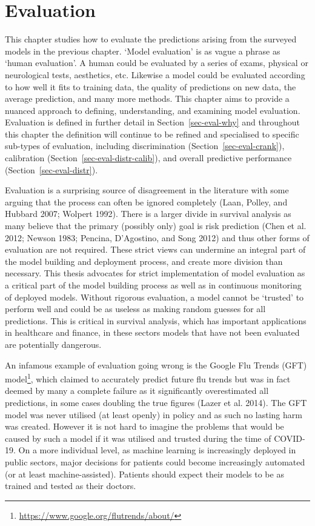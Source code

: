 \documentclass[
  letterpaper,
]{scrbook}
\theoremstyle{plain}
\theoremstyle{definition}
\theoremstyle{remark}
\begin{document}

\hypertarget{evaluation}{%
\chapter{Evaluation}\label{evaluation}}

This chapter studies how to evaluate the predictions arising from the
surveyed models in the previous chapter. `Model evaluation' is as vague
a phrase as `human evaluation'. A human could be evaluated by a series
of exams, physical or neurological tests, aesthetics, etc. Likewise a
model could be evaluated according to how well it fits to training data,
the quality of predictions on new data, the average prediction, and many
more methods. This chapter aims to provide a nuanced approach to
defining, understanding, and examining model evaluation. Evaluation is
defined in further detail in Section~\ref{sec-eval-why} and throughout
this chapter the definition will continue to be refined and specialised
to specific sub-types of evaluation, including discrimination
(Section~\ref{sec-eval-crank}), calibration
(Section~\ref{sec-eval-distr-calib}), and overall predictive performance
(Section~\ref{sec-eval-distr}).

Evaluation is a surprising source of disagreement in the literature with
some arguing that the process can often be ignored completely (Laan,
Polley, and Hubbard 2007; Wolpert 1992). There is a larger divide in
survival analysis as many believe that the primary (possibly only) goal
is risk prediction (Chen et al. 2012; Newson 1983; Pencina, D'Agostino,
and Song 2012) and thus other forms of evaluation are not required.
These strict views can undermine an integral part of the model building
and deployment process, and create more division than necessary. This
thesis advocates for strict implementation of model evaluation as a
critical part of the model building process as well as in continuous
monitoring of deployed models. Without rigorous evaluation, a model
cannot be `trusted' to perform well and could be as useless as making
random guesses for all predictions. This is critical in survival
analysis, which has important applications in healthcare and finance, in
these sectors models that have not been evaluated are potentially
dangerous.

An infamous example of evaluation going wrong is the Google Flu Trends
(GFT) model\footnote{\url{https://www.google.org/flutrends/about/}\footnotemark{}},
which claimed to accurately predict future flu trends but was in fact
deemed by many a complete failure as it significantly overestimated all
predictions, in some cases doubling the true figures (Lazer et al.
2014). The GFT model was never utilised (at least openly) in policy and
as such no lasting harm was created. However it is not hard to imagine
the problems that would be caused by such a model if it was utilised and
trusted during the time of COVID-19. On a more individual level, as
machine learning is increasingly deployed in public sectors, major
decisions for patients could become increasingly automated (or at least
machine-assisted). Patients should expect their models to be as trained
and tested as their doctors.
\end{document}
